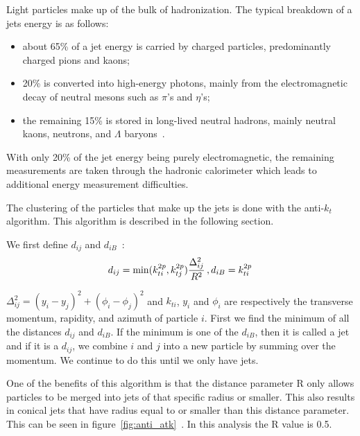 Light particles make up of the bulk of hadronization.  The typical breakdown of a jets energy is as follows:
\begin{itemize}
 \item
about 65\% of a jet energy is carried by charged particles, predominantly
charged pions and kaons;
\item
 20\% is converted into high-energy photons, mainly from the electromagnetic
decay of neutral mesons such as $\pi$'s and $\eta$'s;
\item
 the remaining 15\% is stored in long-lived neutral hadrons, mainly neutral
kaons, neutrons, and $\Lambda$ baryons~\cite{Pandolfi_thesis}.
\end{itemize}

With only 20\% of the jet energy being purely electromagnetic, the remaining measurements are taken through the hadronic calorimeter which leads to additional energy measurement difficulties.

The clustering of the particles that make up the jets is done with the anti-$k_t$ algorithm.  This algorithm is described in the following section. 

We first define $d_{ij}$ and $d_{iB}$~\cite{1126-6708-2008-04-063}:
\begin{equation}
d_{ij} = \min(k_{ti}^{2p}, k_{tj}^{2p}) \frac{\Delta_{ij}^2}{R^2}\,,\\
d_{iB} = k_{ti}^{2p}\,
\end{equation}

$\Delta_{ij}^2 = (y_i-y_j)^2 + (\phi_i - \phi_j)^2$ and $k_{ti}$, $y_i$ and $\phi_i$ are respectively the transverse momentum, rapidity, and azimuth of particle $i$. First we find the minimum of all the distances $d_{ij}$ and $d_{iB}$. If the minimum is one of the $d_{iB}$, then it is called a jet and if it is a $d_{ij}$, we combine $i$ and $j$ into a new particle by summing over the momentum.  We continue to do this until we only have jets.

One of the benefits of this algorithm is that the distance parameter R only allows particles to be merged into jets of that specific radius or smaller.  This also results in conical jets that have radius equal to or smaller than this distance parameter. This can be seen in figure~\ref{fig:anti_atk}~\cite{1126-6708-2008-04-063}. In this analysis the R value is 0.5.

